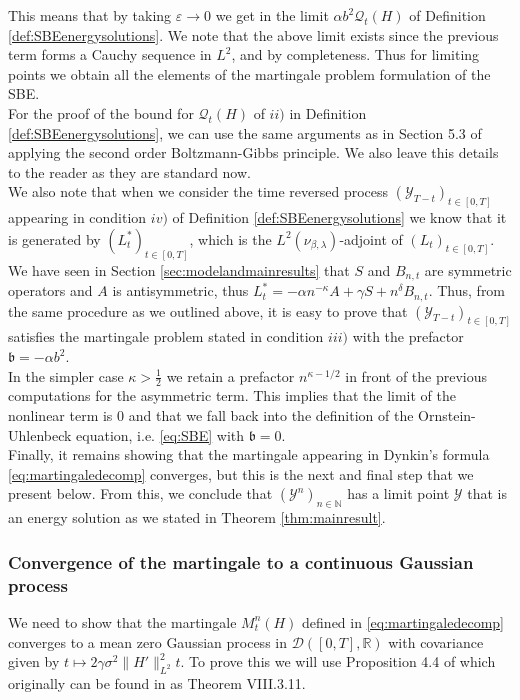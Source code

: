 \documentclass[a4paper, reqno, 12pt]{amsart}
\theoremstyle{plain}
\theoremstyle{definition}
\newcommand{\R}{\mathbb{R}}
\begin{document}
This means that by taking $\varepsilon\to 0$ we get in the limit $\alpha  b^2\mathcal{Q}_t(H)$ of Definition \ref{def:SBEenergysolutions}. We note that  the above limit exists since the previous term forms a Cauchy  sequence in $L^2$,  and by completeness. Thus for limiting points we obtain all the elements of the martingale problem formulation of the SBE.\\
For the proof of the bound for $\mathcal Q_t(H)$ of $ii)$ in Definition \ref{def:SBEenergysolutions}, we can use the same arguments as in Section 5.3 of \cite{GJ14} applying the second order Boltzmann-Gibbs principle. We also leave  this details to the reader as they are standard now.\\
We also note that when we consider the time reversed process $(\mathcal Y_{T-t})_{t\in[0,T]}$ appearing in  condition $iv)$ of Definition \ref{def:SBEenergysolutions} we know that it is generated by $(L_t^{\ast})_{t\in[0,T]}$, which is the $L^2(\nu_{\beta,\lambda})$-adjoint of $(L_t)_{t\in[0,T]}$.
We have seen in Section \ref{sec:modelandmainresults} that $S$ and $B_{n,t}$ are symmetric operators and $A$ is antisymmetric, thus $L^{\ast}_t = -\alpha n^{-\kappa}A + \gamma S+ n^{\delta}B_{n,t}$. Thus, from the same procedure as we outlined above,  it is easy to prove that $(\mathcal Y_{T-t})_{t\in[0,T]}$ satisfies the martingale problem stated in condition $iii)$ with the prefactor $\mathfrak b=-\alpha b^2$. \\
In the simpler case $\kappa>\frac{1}{2}$ we retain a prefactor $n^{\kappa-1/2}$ in front of the previous computations for the asymmetric term. This implies that the limit of the nonlinear term is $0$ and that we fall back into the definition of the Ornstein-Uhlenbeck equation, i.e. \eqref{eq:SBE} with $\mathfrak b=0$.\\

Finally,  it remains showing that the  martingale appearing in Dynkin's formula \eqref{eq:martingaledecomp} converges, but this is the next and final step that we present below. From this, we conclude that 
$(\mathcal{Y}^n)_{n\in\mathbb N}$ has a limit point $\mathcal{Y}$ that is an energy solution as we stated in Theorem \ref{thm:mainresult}. 

\subsubsection{Convergence of the martingale to a continuous Gaussian process} \label{sec:martconvergence}
We need to show that the martingale $M^n_t(H)$ defined in \eqref{eq:martingaledecomp} converges to a mean zero Gaussian process in $\mathcal{D}([0,T],\R)$ with covariance given by $t\mapsto 2\gamma \sigma^2 \|H'\|_{L^2}^2t$. 
To prove this we will use Proposition 4.4 of \cite{GJMM24} which originally can be found in \cite{JS03} as Theorem VIII.3.11.
\end{document}
